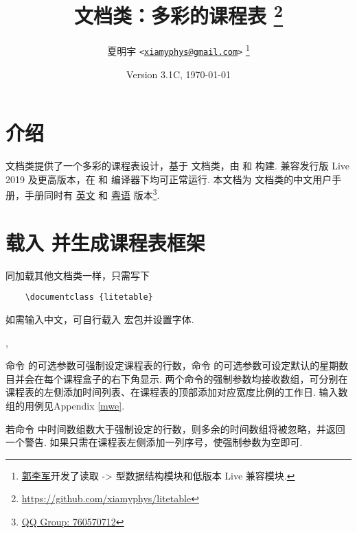 \documentclass[letterpaper]{l3doc}
\title
{
  \bfseries\cls{litetable} 文档类：多彩的课程表
  \thanks{\url{https://github.com/xiamyphys/litetable}}
}
\author
{
  夏明宇 \texttt{<\href{mailto:xiamyphys@gmail.com}{xiamyphys@gmail.com}>}
  \thanks{\href{https://github.com/ljguo1020}{郭李军}开发了读取 \meta{left} -> \meta{right} 型数据结构模块和低版本 \hologo{TeX} Live 兼容模块.}
}
\date{Version 3.1C, \today}
\begin{document}
\maketitle

\section{介绍}

 文档类提供了一个多彩的课程表设计，基于  文档类，由  和  构建. 兼容发行版  Live 2019 及更高版本，在  和  编译器下均可正常运行. 本文档为  文档类的中文用户手册，手册同时有 \href{./litetable-en.pdf}{英文} 和 \href{./litetable-hk.pdf}{粤语} 版本\footnote{\href{https://qm.qq.com/q/RyssAhG4qy}{QQ Group: 760570712}}.

\section{载入  并生成课程表框架}

同加载其他文档类一样，只需写下

\begin{framed}
  \begin{verbatim}
    \documentclass {litetable}
  \end{verbatim}
\end{framed}

如需输入中文，可自行载入  宏包并设置字体.

\begin{function}{\timelist,\weeklist}
  \begin{syntax}
                  
         
  \end{syntax}

  命令  的可选参数可强制设定课程表的行数，命令  的可选参数可设定默认的星期数目并会在每个课程盒子的右下角显示. 两个命令的强制参数均接收数组，可分别在课程表的左侧添加时间列表、在课程表的顶部添加对应宽度比例的工作日. 输入数组的用例见Appendix \ref{mwe}.

  若命令  中时间数组数大于强制设定的行数，则多余的时间数组将被忽略，并返回一个警告. 如果只需在课程表左侧添加一列序号，使强制参数为空即可.
\end{function}
\end{document}
